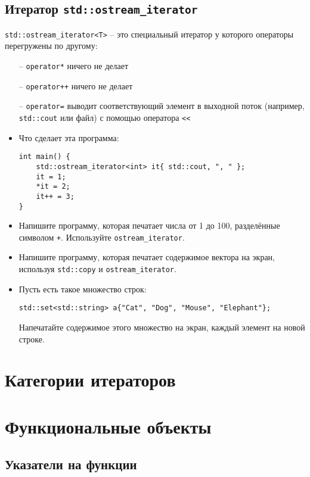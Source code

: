 \documentclass{article}
\begin{document}
\subsection*{Итератор \texttt{std::ostream\_iterator}}
\texttt{std::ostream\_iterator<T>} -- это специальный итератор у которого операторы перегружены по другому:
\begin{itemize}
\item[--] \texttt{operator*} ничего не делает
\item[--] \texttt{operator++} ничего не делает
\item[--] \texttt{operator=} выводит соответствующий элемент в выходной поток (например, \texttt{std::cout} или файл) с помощью оператора \texttt{<{}<} 
\end{itemize}

\begin{itemize}
\item Что сделает эта программа:
\begin{lstlisting}
int main() {
    std::ostream_iterator<int> it{ std::cout, ", " };
    it = 1;
    *it = 2;
    it++ = 3;
}
\end{lstlisting}
\item Напишите программу, которая печатает числа от 1 до 100, разделённые символом \texttt{+}. Используйте \texttt{ostream\_iterator}.
\item Напишите программу, которая печатает содержимое вектора на экран, используя \texttt{std::copy} и \texttt{ostream\_iterator}.
\item Пусть есть такое множество строк:
\begin{lstlisting}
std::set<std::string> a{"Cat", "Dog", "Mouse", "Elephant"};
\end{lstlisting}
Напечатайте содержимое этого множество на экран, каждый элемент на новой строке.
\end{itemize}



\newpage
\section*{Категории итераторов}

\newpage
\section*{Функциональные объекты}
\subsection*{Указатели на функции}
\end{document}
